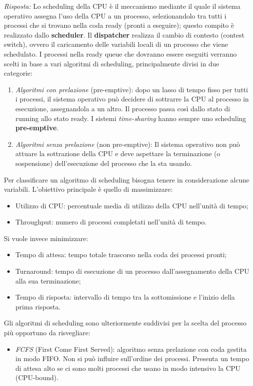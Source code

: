 \documentclass{article}
\newenvironment{solution}
    {\textit{Risposta:}}
    {}
\begin{document}
\begin{solution}
Lo scheduling della CPU è il meccanismo mediante il quale il sistema operativo assegna l’uso della CPU a un processo, selezionandolo tra tutti i processi che si trovano nella coda ready (pronti a eseguire); questo compito è realizzato dallo \textbf{scheduler}.
\newline
\newline
Il \textbf{dispatcher} realizza il cambio di contesto (contest switch), ovvero il caricamento delle variabili locali di un processo che viene schedulato.
\newline
\newline
I processi nella ready queue che dovranno essere eseguiti verranno scelti in base a vari algoritmi di scheduling, principalmente divisi in due categorie:
\begin{enumerate}
    \item \emph{Algoritmi con prelazione} (pre-emptive): dopo un lasso di tempo fisso per tutti i processi, il sistema operativo può decidere di sottrarre la CPU al processo in esecuzione, assegnandola a un altro. Il processo passa così dallo stato di running allo stato ready.
    \newline
    I sistemi \textit{time-sharing} hanno sempre uno scheduling \textbf{pre-emptive}.
    
    \item \emph{Algoritmi senza prelazione} (non pre-emptive): Il sistema operativo non può attuare la sottrazione della CPU e deve aspettare la terminazione (o sospensione) dell’esecuzione del processo che la sta usando.
\end{enumerate}
Per classificare un algoritmo di scheduling bisogna tenere in considerazione alcune variabili.  L’obiettivo principale è quello di massimizzare: 
\begin{itemize}
    \item Utilizzo di CPU: percentuale media di utilizzo della CPU nell’unità di tempo;
    \item Throughput: numero di processi completati nell’unità di tempo.
\end{itemize}
Si vuole invece minimizzare:
\begin{itemize}
    \item Tempo di attesa: tempo totale trascorso nella coda dei processi pronti;
    \item Turnaround: tempo di esecuzione di un processo dall’assegnamento della CPU alla sua terminazione;
    \item Tempo di risposta: intervallo di tempo tra la sottomissione e l’inizio della prima risposta.
\end{itemize}
Gli algoritmi di scheduling sono ulteriormente suddivisi per la scelta del processo più opportuno da risvegliare:
\begin{itemize}
    \item \emph{FCFS} (First Come First Served): algoritmo senza prelazione con coda gestita in modo FIFO.
    \newline
    Non si può influire sull’ordine dei processi. Presenta un tempo di attesa alto se ci sono molti processi che usano in modo intensivo la CPU (CPU-bound).
    

\end{itemize}
\end{solution}
\end{document}
